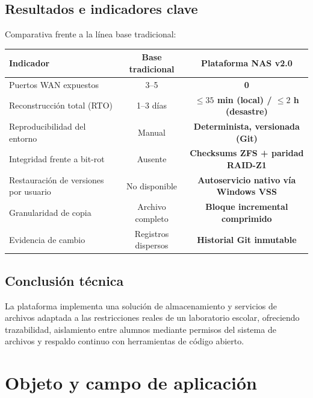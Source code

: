 \documentclass[10pt,a4paper]{article}
\begin{document}
\subsection*{Resultados e indicadores clave}
Comparativa frente a la línea base tradicional:

\begin{table}[htbp]
\centering
\small
\begin{tabular}{|p{6.5cm}|c|c|}
\hline
\textbf{\textsf{Indicador}} & \textbf{\textsf{Base tradicional}} & \textbf{\textsf{Plataforma NAS v2.0}} \\
\hline
Puertos WAN expuestos & 3–5 & \textbf{0} \\
\hline
Reconstrucción total (RTO) & 1–3 días & \textbf{$\le 35$ min (local) / $\le 2$ h (desastre)} \\
\hline
Reproducibilidad del entorno & Manual & \textbf{Determinista, versionada (Git)} \\
\hline
Integridad frente a bit-rot & Ausente & \textbf{Checksums ZFS + paridad RAID-Z1} \\
\hline
Restauración de versiones por usuario & No disponible & \textbf{Autoservicio nativo vía Windows VSS} \\
\hline
Granularidad de copia & Archivo completo & \textbf{Bloque incremental comprimido} \\
\hline
Evidencia de cambio & Registros dispersos & \textbf{Historial Git inmutable} \\
\hline
\end{tabular}
\end{table}

\subsection*{Conclusión técnica}
La plataforma implementa una solución de almacenamiento y servicios de archivos adaptada a las restricciones reales de un laboratorio escolar, ofreciendo trazabilidad, aislamiento entre alumnos mediante permisos del sistema de archivos y respaldo continuo con herramientas de código abierto.

\newpage

\section{Objeto y campo de aplicación}
\end{document}
